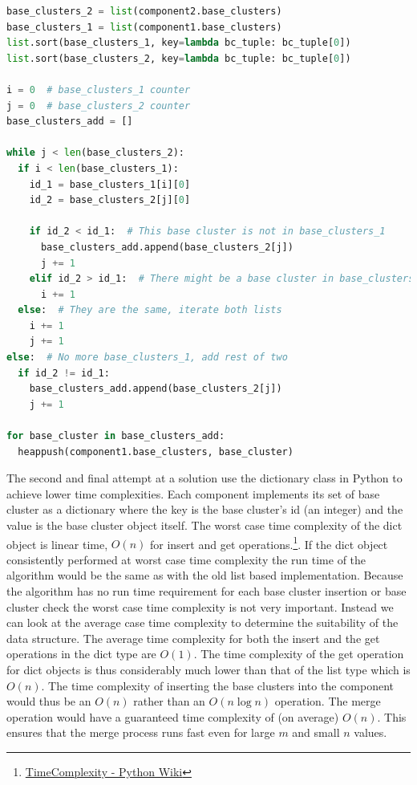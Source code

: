 \begin{lstlisting}[float=ht, language=python, breaklines=true, label=lst:simultaneousmerge, caption={Simultaneous merge of components.}] 
base_clusters_2 = list(component2.base_clusters)
base_clusters_1 = list(component1.base_clusters)
list.sort(base_clusters_1, key=lambda bc_tuple: bc_tuple[0])
list.sort(base_clusters_2, key=lambda bc_tuple: bc_tuple[0])

i = 0  # base_clusters_1 counter
j = 0  # base_clusters_2 counter
base_clusters_add = []

while j < len(base_clusters_2):
  if i < len(base_clusters_1):
    id_1 = base_clusters_1[i][0]
    id_2 = base_clusters_2[j][0]

    if id_2 < id_1:  # This base cluster is not in base_clusters_1
      base_clusters_add.append(base_clusters_2[j])
      j += 1
    elif id_2 > id_1:  # There might be a base cluster in base_clusters_1
      i += 1
  else:  # They are the same, iterate both lists
    i += 1
    j += 1
else:  # No more base_clusters_1, add rest of two
  if id_2 != id_1:
    base_clusters_add.append(base_clusters_2[j])
    j += 1

for base_cluster in base_clusters_add:
  heappush(component1.base_clusters, base_cluster)
\end{lstlisting}
   
The second and final attempt at a solution use the dictionary class in Python to achieve lower time complexities. Each component implements its set of base cluster as a dictionary where the key is the base cluster's id (an integer) and the value is the base cluster object itself. The worst case time complexity of the dict object is linear time, \(O(n)\) for insert and get operations.\footnote{\href{https://wiki.python.org/moin/TimeComplexity}{TimeComplexity - Python Wiki}}. If the dict object consistently performed at worst case time complexity the run time of the algorithm would be the same as with the old list based implementation. Because the algorithm has no run time requirement for each base cluster insertion or base cluster check the worst case time complexity is not very important. Instead we can look at the average case time complexity to determine the suitability of the data structure. The average time complexity for both the insert and the get operations in the dict type are \(O(1)\). The time complexity of the get operation for dict objects is thus considerably much lower than that of the list type which is \(O(n)\). The time complexity of inserting the base clusters into the component would thus be an \(O(n)\) rather than an \(O(n \log n)\) operation. The merge operation would have a guaranteed time complexity of (on average) \(O(n)\). This ensures that the merge process runs fast even for large \(m\) and small \(n\) values.


